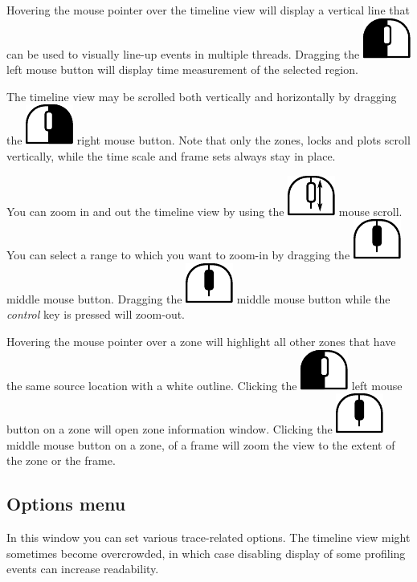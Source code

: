 \documentclass[hidelinks,titlepage,a4paper]{article}
\newcommand{\LMB}{\includegraphics[height=.8\baselineskip]{icons/lmb}}
\newcommand{\RMB}{\includegraphics[height=.8\baselineskip]{icons/rmb}}
\newcommand{\MMB}{\includegraphics[height=.8\baselineskip]{icons/mmb}}
\newcommand{\Scroll}{\includegraphics[height=.8\baselineskip]{icons/scroll}}
\begin{document}
Hovering the \faMousePointer{} mouse pointer over the timeline view will display a vertical line that can be used to visually line-up events in multiple threads. Dragging the \LMB{} left mouse button will display time measurement of the selected region.

The timeline view may be scrolled both vertically and horizontally by dragging the \RMB{} right mouse button. Note that only the zones, locks and plots scroll vertically, while the time scale and frame sets always stay in place.

You can zoom in and out the timeline view by using the \Scroll{} mouse scroll. You can select a range to which you want to zoom-in by dragging the \MMB{} middle mouse button. Dragging the \MMB{} middle mouse button while the \emph{control} key is pressed will zoom-out.

Hovering the \faMousePointer{} mouse pointer over a zone will highlight all other zones that have the same source location with a white outline. Clicking the \LMB{} left mouse button on a zone will open zone information window. Clicking the \MMB{} middle mouse button on a zone, of a frame will zoom the view to the extent of the zone or the frame.

\subsection{Options menu}
\label{options}

In this window you can set various trace-related options. The timeline view might sometimes become overcrowded, in which case disabling display of some profiling events can increase readability.
\end{document}
